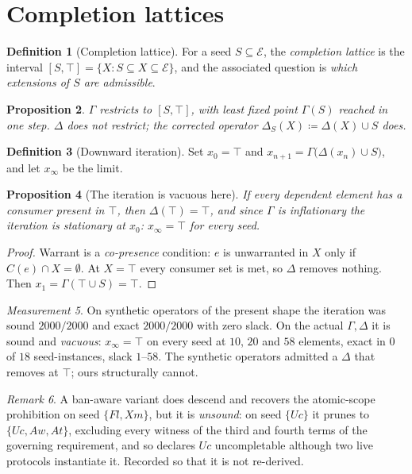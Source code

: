 \documentclass[11pt]{article}
\theoremstyle{definition}
\newtheorem{definition}{Definition}[section]
\theoremstyle{plain}
\newtheorem{proposition}[definition]{Proposition}
\theoremstyle{remark}
\newtheorem{measurement}[definition]{Measurement}
\newtheorem{remark}[definition]{Remark}
\newcommand{\El}{\mathcal{E}}
\begin{document}
\section{Completion lattices}

\begin{definition}[Completion lattice]
For a seed $S \subseteq \El$, the \emph{completion lattice} is the interval
$[S,\top] = \{X : S \subseteq X \subseteq \El\}$, and the associated question is
\emph{which extensions of $S$ are admissible}.
\end{definition}

\begin{proposition}
$\Gamma$ restricts to $[S,\top]$, with least fixed point $\Gamma(S)$ reached in
one step. $\Delta$ does not restrict; the corrected operator
$\Delta_S(X) \coloneqq \Delta(X) \cup S$ does.
\end{proposition}

\begin{definition}[Downward iteration]
Set $x_0 = \top$ and $x_{n+1} = \Gamma\bigl(\Delta(x_n) \cup S\bigr)$, and let
$x_\infty$ be the limit.
\end{definition}

\begin{proposition}[The iteration is vacuous here]\label{prop:vacuous}
If every dependent element has a consumer present in $\top$, then
$\Delta(\top) = \top$, and since $\Gamma$ is inflationary the iteration is
stationary at $x_0$: $x_\infty = \top$ for every seed.
\end{proposition}

\begin{proof}
Warrant is a \emph{co-presence} condition: $e$ is unwarranted in $X$ only if
$C(e) \cap X = \emptyset$. At $X = \top$ every consumer set is met, so $\Delta$
removes nothing. Then $x_1 = \Gamma(\top \cup S) = \top$.
\end{proof}

\begin{measurement}\label{meas:vacuous}
On synthetic operators of the present shape the iteration was sound $2000/2000$
and exact $2000/2000$ with zero slack. On the actual $\Gamma,\Delta$ it is sound
and \emph{vacuous}: $x_\infty = \top$ on every seed at $10$, $20$ and $58$
elements, exact in $0$ of $18$ seed-instances, slack $1$--$58$. The synthetic
operators admitted a $\Delta$ that removes at $\top$; ours structurally cannot.
\end{measurement}

\begin{remark}
A ban-aware variant does descend and recovers the atomic-scope prohibition on
seed $\{Fl,Xm\}$, but it is \emph{unsound}: on seed $\{Uc\}$ it prunes to
$\{Uc,Aw,At\}$, excluding every witness of the third and fourth terms of the
governing requirement, and so declares $Uc$ uncompletable although two live
protocols instantiate it. Recorded so that it is not re-derived.
\end{remark}
\end{document}

